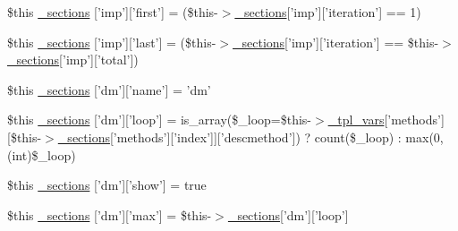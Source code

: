 \begin{DoxyCompactItemize}
\item 
\$this \hyperlink{34d6fa4bfd5eef6424a9ddc74a166350_2_06_06-14_05_06_06-1407541581_05method_8tpl_8php_a944e6c7a585d4112ef30703091605a27}{\-\_\-sections} \mbox{[}'imp'\mbox{]}\mbox{[}'first'\mbox{]} = (\$this-\/$>$\hyperlink{_06_06127_05_06_0612781687_05pkgelementindex_8tpl_8php_a9e3d26b39edfe29c3f29b8035ef33828}{\-\_\-sections}\mbox{[}'imp'\mbox{]}\mbox{[}'iteration'\mbox{]} == 1)
\item 
\$this \hyperlink{34d6fa4bfd5eef6424a9ddc74a166350_2_06_06-14_05_06_06-1407541581_05method_8tpl_8php_acaf83940c87091008a81b9056a115eb5}{\-\_\-sections} \mbox{[}'imp'\mbox{]}\mbox{[}'last'\mbox{]} = (\$this-\/$>$\hyperlink{_06_06127_05_06_0612781687_05pkgelementindex_8tpl_8php_a9e3d26b39edfe29c3f29b8035ef33828}{\-\_\-sections}\mbox{[}'imp'\mbox{]}\mbox{[}'iteration'\mbox{]} == \$this-\/$>$\hyperlink{_06_06127_05_06_0612781687_05pkgelementindex_8tpl_8php_a9e3d26b39edfe29c3f29b8035ef33828}{\-\_\-sections}\mbox{[}'imp'\mbox{]}\mbox{[}'total'\mbox{]})
\item 
\$this \hyperlink{34d6fa4bfd5eef6424a9ddc74a166350_2_06_06-14_05_06_06-1407541581_05method_8tpl_8php_a11a68100da7056d041e5cd543be9a901}{\-\_\-sections} \mbox{[}'dm'\mbox{]}\mbox{[}'name'\mbox{]} = 'dm'
\item 
\$this \hyperlink{34d6fa4bfd5eef6424a9ddc74a166350_2_06_06-14_05_06_06-1407541581_05method_8tpl_8php_af28e4bf68d6d592fda7b7d1dc9540040}{\-\_\-sections} \mbox{[}'dm'\mbox{]}\mbox{[}'loop'\mbox{]} = is\-\_\-array(\$\-\_\-loop=\$this-\/$>$\hyperlink{_06_06127_05_06_0612781687_05pkgelementindex_8tpl_8php_a4a4846d8e68d455590131a05697f67a3}{\-\_\-tpl\-\_\-vars}\mbox{[}'methods'\mbox{]}\mbox{[}\$this-\/$>$\hyperlink{_06_06127_05_06_0612781687_05pkgelementindex_8tpl_8php_a9e3d26b39edfe29c3f29b8035ef33828}{\-\_\-sections}\mbox{[}'methods'\mbox{]}\mbox{[}'index'\mbox{]}\mbox{]}\mbox{[}'descmethod'\mbox{]}) ? count(\$\-\_\-loop) \-: max(0, (int)\$\-\_\-loop)
\item 
\$this \hyperlink{34d6fa4bfd5eef6424a9ddc74a166350_2_06_06-14_05_06_06-1407541581_05method_8tpl_8php_adcd45fde1c19e7cd242ac459d32b0708}{\-\_\-sections} \mbox{[}'dm'\mbox{]}\mbox{[}'show'\mbox{]} = true
\item 
\$this \hyperlink{34d6fa4bfd5eef6424a9ddc74a166350_2_06_06-14_05_06_06-1407541581_05method_8tpl_8php_a6572cb532cf0546faf0f90667ffbfbba}{\-\_\-sections} \mbox{[}'dm'\mbox{]}\mbox{[}'max'\mbox{]} = \$this-\/$>$\hyperlink{_06_06127_05_06_0612781687_05pkgelementindex_8tpl_8php_a9e3d26b39edfe29c3f29b8035ef33828}{\-\_\-sections}\mbox{[}'dm'\mbox{]}\mbox{[}'loop'\mbox{]}

\end{DoxyCompactItemize}
